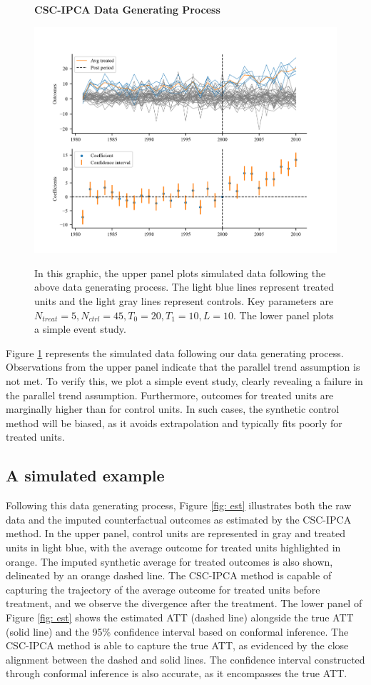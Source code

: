 \documentclass[12pt]{article}
\begin{document}
\begin{figure}[!ht]
    \centering
    \caption{\textbf{CSC-IPCA Data Generating Process}}
    \includegraphics{figs/data_plot.png}
    \label{fig: sim}
    \caption*{\footnotesize{In this graphic, the upper panel plots simulated data following the above data generating process. The light blue lines represent treated units and the light gray lines represent controls. Key parameters are $N_{treat} = 5, N_{ctrl} = 45, T_0=20, T_1=10, L=10$. The lower panel plots a simple event study.}}
    \end{figure}

Figure \ref{fig: sim} represents the simulated data following our data generating process. Observations from the upper panel indicate that the parallel trend assumption is not met. To verify this, we plot a simple event study, clearly revealing a failure in the parallel trend assumption. Furthermore, outcomes for treated units are marginally higher than for control units. In such cases, the synthetic control method will be biased, as it avoids extrapolation and typically fits poorly for treated units.

\subsection{A simulated example}

Following this data generating process, Figure \ref{fig: est} illustrates both the raw data and the imputed counterfactual outcomes as estimated by the CSC-IPCA method. In the upper panel, control units are represented in gray and treated units in light blue, with the average outcome for treated units highlighted in orange. The imputed synthetic average for treated outcomes is also shown, delineated by an orange dashed line. The CSC-IPCA method is capable of capturing the trajectory of the average outcome for treated units before treatment, and we observe the divergence after the treatment. The lower panel of Figure \ref{fig: est} shows the estimated ATT (dashed line) alongside the true ATT (solid line) and the 95\% confidence interval based on conformal inference. The CSC-IPCA method is able to capture the true ATT, as evidenced by the close alignment between the dashed and solid lines. The confidence interval constructed through conformal inference is also accurate, as it encompasses the true ATT.
\end{document}

